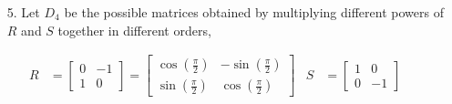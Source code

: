 \documentclass[letterpaper,12pt]{article}
\theoremstyle{definition}
\begin{document}
\pagebreak
\begin{enumerate}
        \item[5.]  Let $D_4$ be the possible matrices obtained by multiplying different powers of $R$ and $S$ together in different orders,
\end{enumerate}
 \begin{align*}R &= \begin{bmatrix}
            0 & -1 \\ 1 & 0
        \end{bmatrix} = \begin{bmatrix}
            \cos \left (\frac{\pi}{2} \right ) & -\sin \left (\frac{\pi}{2} \right ) \\ \sin \left (\frac{\pi}{2} \right ) & \cos \left (\frac{\pi}{2} \right )
        \end{bmatrix} & S &= \begin{bmatrix}
            1 & 0 \\ 0 & -1
        \end{bmatrix}\end{align*}
\end{document}
